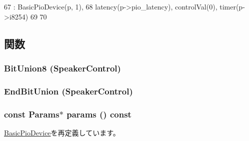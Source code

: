 \begin{DoxyCode}
67                        : BasicPioDevice(p, 1),
68         latency(p->pio_latency), controlVal(0), timer(p->i8254)
69     {
70     }
\end{DoxyCode}


\subsection{関数}
\hypertarget{classX86ISA_1_1Speaker_a9dee9e496fb415ab25e4f3e1b9540783}{
\subsubsection[{BitUnion8}]{\setlength{\rightskip}{0pt plus 5cm}BitUnion8 (SpeakerControl)}}
\label{classX86ISA_1_1Speaker_a9dee9e496fb415ab25e4f3e1b9540783}
\hypertarget{classX86ISA_1_1Speaker_ad12d02df1d565ee6a83773de872eaa0a}{
\subsubsection[{EndBitUnion}]{\setlength{\rightskip}{0pt plus 5cm}EndBitUnion (SpeakerControl)}}
\label{classX86ISA_1_1Speaker_ad12d02df1d565ee6a83773de872eaa0a}
\hypertarget{classX86ISA_1_1Speaker_acd3c3feb78ae7a8f88fe0f110a718dff}{
\subsubsection[{params}]{\setlength{\rightskip}{0pt plus 5cm}const {\bf Params}$\ast$ params () const}}
\label{classX86ISA_1_1Speaker_acd3c3feb78ae7a8f88fe0f110a718dff}


\hyperlink{classBasicPioDevice_acd3c3feb78ae7a8f88fe0f110a718dff}{BasicPioDevice}を再定義しています。


